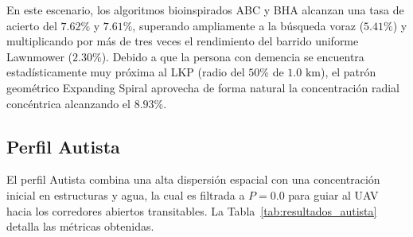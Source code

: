 \begin{table}[H]
	{\label{tab:resultados_demencia}
	}
\end{table}

En este escenario, los algoritmos bioinspirados ABC y BHA alcanzan una tasa de acierto del $7.62\%$ y $7.61\%$, superando ampliamente a la búsqueda voraz ($5.41\%$) y multiplicando por más de tres veces el rendimiento del barrido uniforme Lawnmower ($2.30\%$). Debido a que la persona con demencia se encuentra estadísticamente muy próxima al LKP (radio del $50\%$ de $1.0\text{ km}$), el patrón geométrico Expanding Spiral aprovecha de forma natural la concentración radial concéntrica alcanzando el $8.93\%$.

\subsection{Perfil Autista}

El perfil Autista combina una alta dispersión espacial con una concentración inicial en estructuras y agua, la cual es filtrada a $P=0.0$ para guiar al UAV hacia los corredores abiertos transitables. La Tabla~\ref{tab:resultados_autista} detalla las métricas obtenidas.

